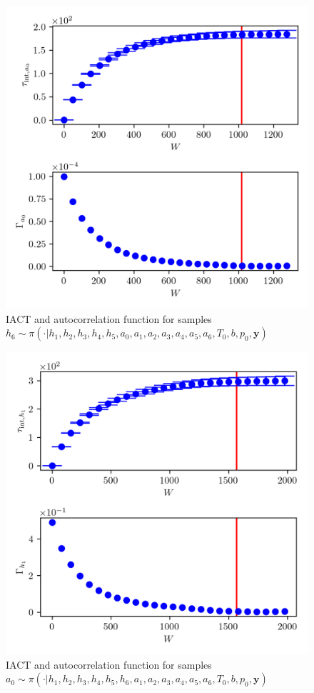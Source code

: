 \begin{figure}[ht!]
	\centering
	\includegraphics{UwerrTauIntTWalk5.png}
	\caption[IACT and autocorrelation function for $h_6$ samples.]{IACT and autocorrelation function for samples $h_6 \sim \pi( \cdot | h_1, h_2,h_3,h_4,h_5,a_0,a_1,a_2,a_3,a_4,a_5,a_6,T_0,b,p_0,  \bm{y})$}
	\label{fig:}
\end{figure}


\begin{figure}[ht!]
	\centering
	\includegraphics{UwerrTauIntTWalk6.png}
	\caption[IACT and autocorrelation function for $a_0$ samples.]{IACT and autocorrelation function for samples $a_0 \sim \pi( \cdot | h_1, h_2,h_3,h_4,h_5,h_6,a_1,a_2,a_3,a_4,a_5,a_6,T_0,b,p_0,  \bm{y})$}
	\label{fig:}
\end{figure}

